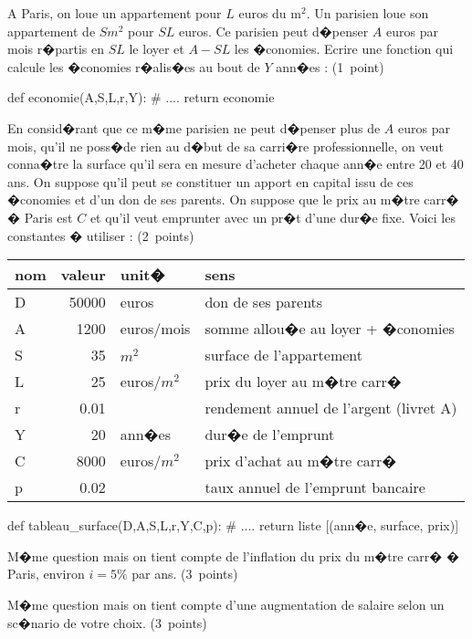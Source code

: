 \begin{xexercice}
\exequest A Paris, on loue un appartement pour $L$ euros du m$^2$. Un parisien loue son appartement de $S m^2$ pour $SL$ euros. Ce parisien peut d�penser $A$ euros par mois r�partis en $SL$ le loyer et $A-SL$ les �conomies. Ecrire une fonction qui calcule les �conomies r�alis�es au bout de $Y$ ann�es : (1~point)

\begin{verbatimx}
def economie(A,S,L,r,Y):
    # ....
    return economie
\end{verbatimx}
 

\exequest En consid�rant que ce m�me parisien ne peut d�penser plus de $A$ euros par mois, qu'il ne poss�de rien au d�but de sa carri�re professionnelle, on veut conna�tre la surface qu'il sera en mesure d'acheter chaque ann�e entre 20 et 40 ans. On suppose qu'il peut se constituer un apport en capital issu de ces �conomies et d'un don de ses parents. On suppose que le prix au m�tre carr� � Paris est $C$ et qu'il veut emprunter avec un pr�t d'une dur�e fixe. Voici les constantes � utiliser : (2~points)

\begin{center}\begin{small}\begin{tabular}{l|r|l|l} 
nom & valeur & unit� & sens \\ \hline
D & 50000 & euros & don de ses parents \\
A & 1200 & euros/mois & somme allou�e au loyer + �conomies \\
S & 35 & $m^2$ &  surface de l'appartement \\
L & 25 & euros/$m^2$ & prix du loyer au m�tre carr� \\
r & 0.01 & & rendement annuel de l'argent (livret A) \\
Y & 20 &  ann�es & dur�e de l'emprunt \\
C & 8000 & euros/$m^2$ & prix d'achat au m�tre carr� \\
p & 0.02 & & taux annuel de l'emprunt bancaire  
\end{tabular}\end{small}\end{center}

\begin{verbatimx}
def tableau_surface(D,A,S,L,r,Y,C,p):
    # ....
    return liste [(ann�e, surface, prix)]
\end{verbatimx}

\exequest M�me question mais on tient compte de l'inflation du prix du m�tre carr� � Paris, environ $i=5\%$ par ans. (3~points)

\exequest M�me question mais on tient compte d'une augmentation de salaire selon un sc�nario de votre choix. (3~points)


\end{xexercice}



